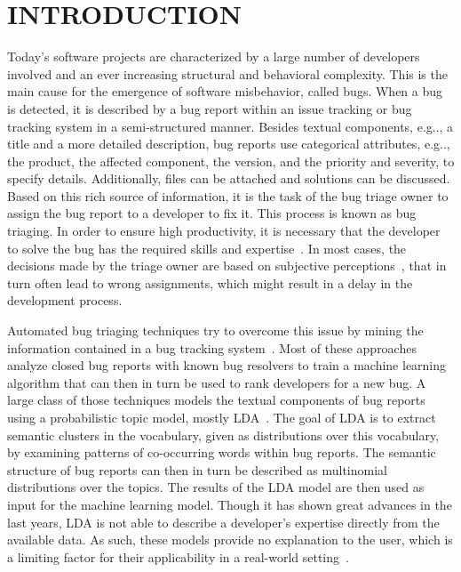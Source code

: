 \documentclass[a4paper,twoside]{article}
\makeatletter
\DeclareRobustCommand\onedot{\futurelet\@let@token\@onedot}
\def\@onedot{\ifx\@let@token.\else.\null\fi\xspace}
\def\eg{e.g\onedot,\xspace}
\makeatother
\begin{document}
\onecolumn
\maketitle \normalsize \setcounter{footnote}{0} \vfill

\section{\uppercase{Introduction}}
\label{sec:introduction}
Today's software projects are characterized by a large number of developers involved and an ever increasing structural and behavioral complexity.
This is the main cause for the emergence of software misbehavior, called bugs. 
When a bug is detected, it is described by a bug report within an issue tracking or bug tracking system in a semi-structured manner.
Besides textual components, \eg a title and a more detailed description, bug reports use categorical attributes, \eg the product, the affected component, the version, and the priority and severity, to specify details.
Additionally, files can be attached and solutions can be discussed.
Based on this rich source of information, it is the task of the bug triage owner to assign the bug report to a developer to fix it.
This process is known as bug triaging.
In order to ensure high productivity, it is necessary that the developer to solve the bug has the required skills and expertise~\cite{sommerville2016softwareengineering}.
In most cases, the decisions made by the triage owner are based on subjective perceptions~\cite{Zou2020HowTechniques}, that in turn often lead to wrong assignments, which might result in a delay in the development process.

Automated bug triaging techniques try to overcome this issue by mining the information contained in a bug tracking system~\cite{Sajedi-Badashian2020GuidelinesResearch,Zou2020HowTechniques,Zhang2015AAnalysis}.
Most of these approaches analyze closed bug reports with known bug resolvers to train a machine learning algorithm that can then in turn be used to rank developers for a new bug.
A large class of those techniques models the textual components of bug reports using a probabilistic topic model, mostly \ac{LDA}~\cite{blei2003latent}.
The goal of \ac{LDA} is to extract semantic clusters in the vocabulary, given as distributions over this vocabulary, by examining patterns of co-occurring words within bug reports.
The semantic structure of bug reports can then in turn be described as multinomial distributions over the topics.
The results of the \ac{LDA} model are then used as input for the machine learning model.
Though it has shown great advances in the last years, \ac{LDA} is not able to describe a developer's expertise directly from the available data.
As such, these models provide no explanation to the user, which is a limiting factor for their applicability in a real-world setting~\cite{Aktas2020AutomatedCase,Zou2020HowTechniques}.
\end{document}

